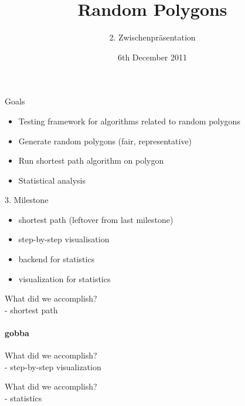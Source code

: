 \documentclass[ucs,9ptb]{beamer}
\title[Random Polygons]{Random Polygons}
\subtitle{2. Zwischenpräsentation}
\institute[FU Berlin]{Freie Universität Berlin}
\date[06.12.2011]{6th December 2011}
\begin{document}
\begin{frame}[plain]
  \titlepage
\end{frame}


\begin{frame}{Goals}
	\begin{itemize}
	\item Testing framework for algorithms related to random polygons
	\item Generate random polygons (fair, representative)
	\item Run shortest path algorithm on polygon
	\item Statistical analysis
	\end{itemize}
\end{frame}

\begin{frame}{3. Milestone}
  \begin{itemize}
  \item shortest path (leftover from last milestone)
  \item step-by-step visualisation
  \item backend for statistics
  \item visualization for statistics
  \end{itemize}
\end{frame}

\begin{frame}{What did we accomplish?\\- shortest path}
  \paragraph{gobba} %
  \label{par:gobba}
  
\end{frame}

\begin{frame}{What did we accomplish?\\- step-by-step visualization}
  
\end{frame}

\begin{frame}{What did we accomplish?\\- statistics}
  
\end{frame}


\end{document}
